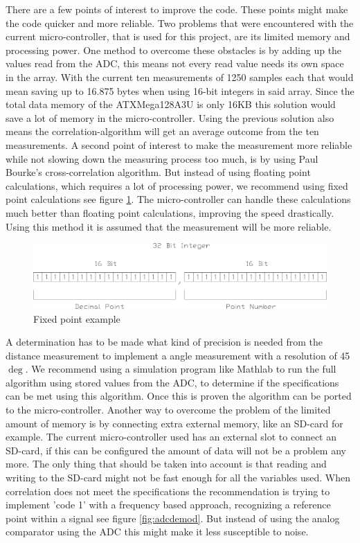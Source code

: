 \documentclass[10pt,a4paper]{article}
\begin{document}
There are a few points of interest to improve the code. These points might make the code quicker and more reliable. Two problems that were encountered with the current micro-controller, that is used for this project, are its limited memory and processing power. One method to overcome these obstacles is by adding up the values read from the ADC, this means not every read value needs its own space in the array. With the current ten measurements of 1250 samples each that would mean saving up to 16.875 bytes when using 16-bit integers in said array. Since the total data memory of the ATXMega128A3U is only 16KB this solution would save a lot of memory in the micro-controller. Using the previous solution also means the correlation-algorithm will get an average outcome from the ten measurements. A second point of interest to make the measurement more reliable while not slowing down the measuring process too much, is by using Paul Bourke's cross-correlation algorithm. But instead of using floating point calculations, which requires a lot of processing power, we recommend using fixed point calculations see figure \ref{fig:fixedpoint}. The micro-controller can handle these calculations much better than floating point calculations, improving the speed drastically. Using this method it is assumed that the measurement will be more reliable.

\begin{figure}[H]
   \centering
   \includegraphics[width=\textwidth]{fixedpoint.pdf}
   \caption{Fixed point example}
   \label{fig:fixedpoint}
\end{figure}
 
A determination has to be made what kind of precision is needed from the distance measurement to implement a angle measurement with a resolution of 45$\deg$.
We recommend using a simulation program like Mathlab to run the full algorithm using stored values from the ADC, to determine if the specifications can be met using this algorithm. Once this is proven the algorithm can be ported to the micro-controller. Another way to overcome the problem of the limited amount of memory is by connecting extra external memory, like an SD-card for example. The current micro-controller used has an external slot to connect an SD-card, if this can be configured the amount of data will not be a problem any more. The only thing that should be taken into account is that reading and writing to the SD-card might not be fast enough for all the variables used. When correlation does not meet the specifications the recommendation is trying to implement 'code 1' with a frequency based approach, recognizing a reference point within a signal see figure \ref{fig:adcdemod}. But instead of using the analog comparator using the ADC this might make it less susceptible to noise.
\end{document}
